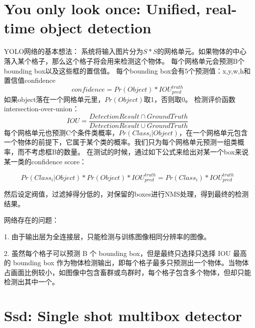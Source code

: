 \documentclass[12pt,onecolumn]{article}
\begin{document}
    \section{You only look once: Unified, real-time object detection\cite{redmon2016you}}
    YOLO网络的基本想法：
    系统将输入图片分为$S\ast S$的网格单元。如果物体的中心落入某个格子，那么这个格子将会用来检测这个物体。
    每个网格单元会预测B个bounding box以及这些框的置信值。
    每个bounding box会有5个预测值：x,y,w,h和置信值confidence
    \begin{equation}
        confidence=Pr(Object)\ast IOU^{truth}_{pred}
    \end{equation}
    如果object落在一个网格单元里，$Pr(Object)$取1，否则取0。
    检测评价函数 intersection-over-union：
    \begin{equation}
        IOU=\frac{DetectionResult\cap GroundTruth}{DetectionResult\cup GroundTruth}
    \end{equation}
    每个网格单元也预测C个条件类概率，$Pr(Class_i|Object)$，在一个网格单元包含一个物体的前提下，它属于某个类的概率。我们只为每个网格单元预测一组类概率，而不考虑框B的数量。 
    在测试的时候，通过如下公式来给出对某一个box来说某一类的confidence score： 
    
    \begin{equation}
        Pr(Class_i|Object)\ast Pr(Object)\ast IOU^{truth}_{pred}=Pr(Class_i)\ast IOU^{truth}_{pred}
    \end{equation}

    然后设定阀值，过滤掉得分低的，对保留的boxes进行NMS处理，得到最终的检测结果。

    网络存在的问题：\par
    1. 由于输出层为全连接层，只能检测与训练图像相同分辨率的图像。\par
    2. 虽然每个格子可以预测 B 个 bounding box，但是最终只选择只选择 IOU 最高的 bounding box 作为物体检测输出，即每个格子最多只预测出一个物体。当物体占画面比例较小，如图像中包含畜群或鸟群时，每个格子包含多个物体，但却只能检测出其中一个。
    
    \section{Ssd: Single shot multibox detector\cite{liu2016ssd}}
    

    {\small
     
    
    }
\end{document}
